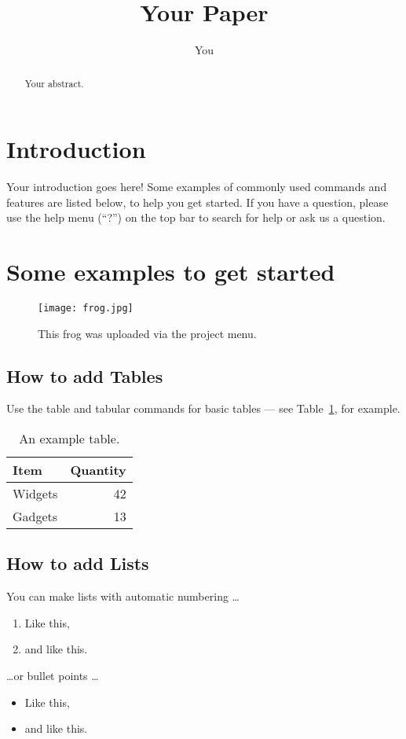 \documentclass[a4paper]{article}
\title{Your Paper}
\author{You}
\begin{document}
\maketitle

\begin{abstract}
Your abstract.
\end{abstract}

\section{Introduction}

Your introduction goes here! Some examples of commonly used commands and
features are listed below, to help you get started. If you have a question,
please use the help menu (``?'') on the top bar to search for help or ask us a
question.

\section{Some examples to get started}

\begin{figure}
\centering
\texttt{[image: frog.jpg]}
\caption{\label{fig:frog}This frog was uploaded via the project menu.}
\end{figure}

\subsection{How to add Tables}

Use the table and tabular commands for basic tables --- see
Table~\ref{tab:widgets}, for example.

\begin{table}
\centering
\begin{tabular}{l|r}
Item & Quantity \\\hline
Widgets & 42 \\
Gadgets & 13
\end{tabular}
\caption{\label{tab:widgets}An example table.}
\end{table}

\subsection{How to add Lists}

You can make lists with automatic numbering \dots

\begin{enumerate}
\item Like this,
\item and like this.
\end{enumerate}
\dots or bullet points \dots
\begin{itemize}
\item Like this,
\item and like this.
\end{itemize}
\end{document}
